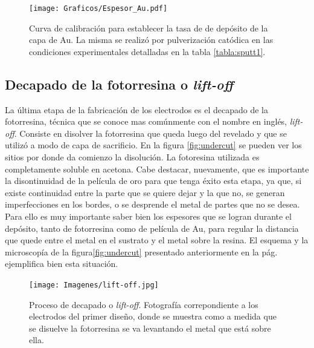 {				%
					   		\begin{figure}[h!]
					   		\begin{center}
							\texttt{[image: Graficos/Espesor\_Au.pdf]}
							\caption[Curva de calibración para el espesor de los electrodos]{Curva de calibración para establecer la tasa de de depósito de la capa de Au. La misma se realizó por pulverización catódica en las condiciones experimentales detalladas en la tabla \ref{tabla:sputt1}.}
							\label{fig:calibracionAu}
							\end{center}
							\end{figure}		  
		
  		\subsection{Decapado de la fotorresina o\textit{ lift-off}}


		 La última etapa de la fabricación de los electrodos es el decapado de la fotorresina, técnica que se conoce mas comúnmente con el nombre en inglés, \textit{lift-off}. Consiste en disolver la fotorresina que queda luego del revelado y que se utilizó a modo de capa de sacrificio. En la figura \ref{fig:undercut} se pueden ver los sitios por donde da comienzo la disolución. La fotoresina utilizada es completamente soluble en acetona. Cabe destacar, nuevamente, que es importante la disontinuidad de la película de oro para que tenga éxito esta etapa, ya que, si existe continuidad entre la parte que se quiere dejar y la que no, se generan imperfecciones en los bordes, o se desprende el metal de partes que no se desea. Para ello es muy importante saber bien los espesores que se logran durante el depósito, tanto de fotorresina como de película de Au, para regular la distancia que quede entre el metal en el sustrato y el metal sobre la resina. El esquema y la microscopía de la figura\ref{fig:undercut} presentado anteriormente en la pág. \pageref{fig:undercut} ejemplifica bien esta situación.

					  \begin{figure}[ht!]
					  \begin{center}
					  \texttt{[image: Imagenes/lift-off.jpg]}
					  \caption[Proceso de decapado o\textit{ lift-off}]{Proceso de decapado o\textit{ lift-off}. Fotografía correpondiente a los electrodos del primer diseño, donde se muestra como a medida que se disuelve la fotorresina se va levantando el metal que está sobre ella.}
					  \label{fig:ultrasonido}
					  \end{center}
					  \end{figure}

}
